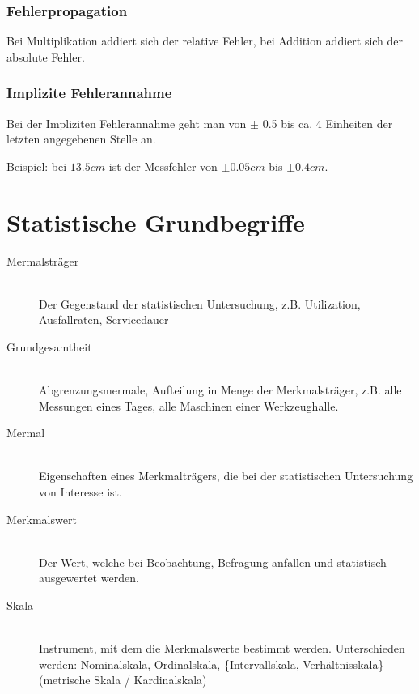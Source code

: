 \subsubsection{Fehlerpropagation}

	Bei Multiplikation addiert sich der relative Fehler, bei Addition addiert sich der absolute Fehler.

\subsubsection{Implizite Fehlerannahme}

Bei der Impliziten Fehlerannahme geht man von $\pm$ 0.5 bis ca. 4 Einheiten der letzten angegebenen Stelle an.

Beispiel: bei $13.5 cm$ ist der Messfehler von $\pm 0.05 cm$ bis $\pm 0.4 cm$.

\section{Statistische Grundbegriffe}

\begin{description}
	\item[Mermalsträger] \hfill \\
		Der Gegenstand der statistischen Untersuchung, z.B. Utilization, Ausfallraten, Servicedauer
	\item[Grundgesamtheit] \hfill \\
		Abgrenzungsmermale, Aufteilung in Menge der Merkmalsträger, z.B. alle Messungen eines Tages, alle Maschinen einer Werkzeughalle.
	\item[Mermal] \hfill \\
		Eigenschaften eines Merkmalträgers, die bei der statistischen Untersuchung von Interesse ist.
	\item[Merkmalswert] \hfill \\
		Der Wert, welche bei Beobachtung, Befragung anfallen und statistisch ausgewertet werden.
	\item[Skala] \hfill \\
		Instrument, mit dem die Merkmalswerte bestimmt werden. Unterschieden werden: Nominalskala, Ordinalskala,  \{Intervallskala, Verhältnisskala\}(metrische Skala / Kardinalskala)
\end{description}

